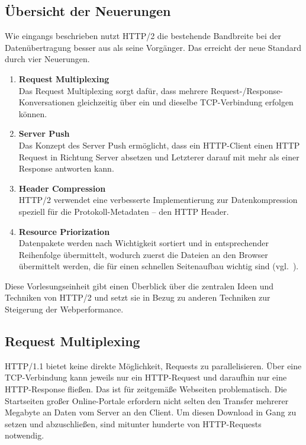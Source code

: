 \documentclass[a4paper, justified, notoc]{tufte-handout} %
\begin{document}
\subsection{Übersicht der Neuerungen} %
\label{sub:neuerungen}
Wie eingangs beschrieben nutzt HTTP/2 die bestehende Bandbreite bei der Datenübertragung besser aus als seine Vorgänger. Das erreicht der neue Standard durch vier Neuerungen. 
\begin{enumerate}
	\item \textbf{Request Multiplexing} \\ Das Request Multiplexing sorgt dafür, dass mehrere Request-/Response-Konversationen gleichzeitig über ein und dieselbe TCP-Verbindung erfolgen können.
	\item \textbf{Server Push} \\ Das Konzept des Server Push ermöglicht, dass ein HTTP-Client einen HTTP Request in Richtung Server absetzen und Letzterer darauf mit mehr als einer Response antworten kann.
	\item \textbf{Header Compression} \\ HTTP/2 verwendet eine verbesserte Implementierung zur Datenkompression speziell für die Protokoll-Metadaten -- den HTTP Header.
	\item \textbf{Resource Priorization} \\ Datenpakete werden nach Wichtigkeit sortiert und in entsprechender Reihenfolge übermittelt, wodurch zuerst die Dateien an den Browser übermittelt werden, die für einen schnellen Seitenaufbau wichtig sind (vgl.~\cite{mueller:2015}). 
\end{enumerate}


Diese Vorlesungseinheit gibt einen Überblick über die zentralen Ideen und Techniken von HTTP/2 und setzt sie in Bezug zu anderen Techniken zur Steigerung der Webperformance.

\subsection{Request Multiplexing} %
\label{sub:reduktion_der_ladezeiten}
HTTP/1.1 bietet keine direkte Möglichkeit, Requests zu parallelisieren. Über eine TCP-Verbindung kann jeweils nur ein HTTP-Request und daraufhin nur eine HTTP-Response fließen. Das ist für zeitgemäße Webseiten problematisch. Die Startseiten großer Online-Portale erfordern nicht selten den Transfer mehrerer Megabyte an Daten vom Server an den Client. Um diesen Download in Gang zu setzen und abzuschließen, sind mitunter hunderte von HTTP-Requests notwendig.
\end{document}
